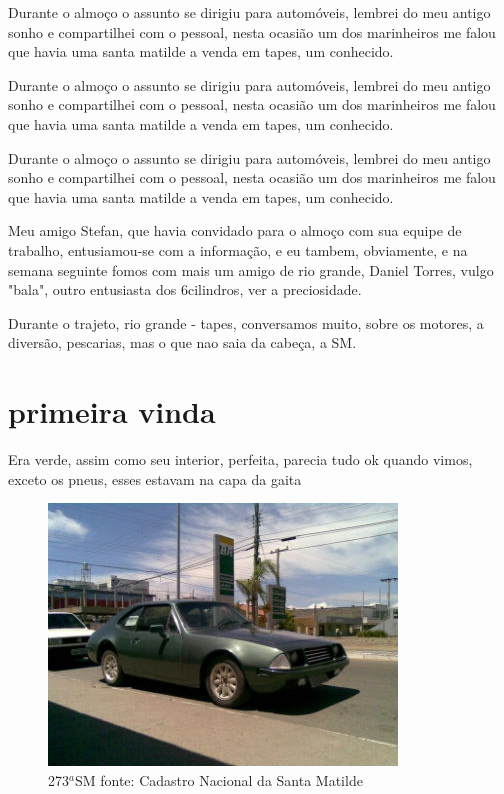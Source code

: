 \documentclass[a4paper]{report}
\begin{document}
Durante o almo\c{c}o o assunto se dirigiu para autom\'oveis, lembrei do meu antigo sonho e compartilhei com o pessoal, nesta ocasi\~ao um dos marinheiros
me falou que havia uma santa matilde a venda em tapes, um conhecido.


Durante o almo\c{c}o o assunto se dirigiu para autom\'oveis, lembrei do meu antigo sonho e compartilhei com o pessoal, nesta ocasi\~ao um dos marinheiros
me falou que havia uma santa matilde a venda em tapes, um conhecido.

Durante o almo\c{c}o o assunto se dirigiu para autom\'oveis, lembrei do meu antigo sonho e compartilhei com o pessoal, nesta ocasi\~ao um dos marinheiros
me falou que havia uma santa matilde a venda em tapes, um conhecido.

Meu amigo Stefan, que havia convidado para o almo\c{c}o com sua equipe de trabalho, entusiamou-se com a informa\c{c}\~ao, e eu tambem, obviamente, e na semana 
seguinte fomos com mais um amigo de rio grande, Daniel Torres, vulgo "bala", outro entusiasta dos 6cilindros, ver a preciosidade.

Durante o trajeto, rio grande - tapes, conversamos muito, sobre os motores, a divers\~ao, pescarias, mas o que nao saia da cabe\c{c}a, a SM.   
\clearpage


\section*{primeira vinda}

Era verde, assim como seu interior, perfeita, parecia tudo ok quando vimos, exceto os pneus, esses estavam na capa da gaita

\begin{figure}[!htb]
\centering
\includegraphics{sm273}
\caption{273$^{a}$SM fonte: Cadastro Nacional da Santa Matilde}
\label{a 273a SM}
\end{figure}
\clearpage
\end{document}
